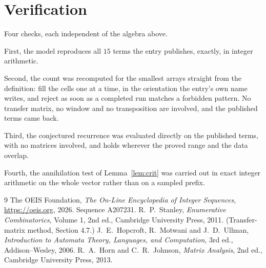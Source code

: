 \documentclass[11pt,a4paper]{article}
\theoremstyle{plain}
\theoremstyle{definition}
\begin{document}
\section{Verification}

Four checks, each independent of the algebra above.

First, the model reproduces all $15$ terms the entry publishes, exactly, in integer
arithmetic.

Second, the count was recomputed for the smallest arrays straight from the definition: fill the
cells one at a time, in the orientation the entry's own name writes, and reject as soon as a
completed run matches a forbidden pattern. No transfer matrix, no window and no transposition
are involved, and the published terms came back.

Third, the conjectured recurrence was evaluated directly on the published terms, with no
matrices involved, and holds wherever the proved range and the data overlap.

Fourth, the annihilation test of Lemma~\ref{lem:crit} was carried out in exact integer
arithmetic on the whole vector rather than on a sampled prefix.

\begin{thebibliography}{9}
 The OEIS Foundation, \emph{The On-Line Encyclopedia of Integer
Sequences}, \url{https://oeis.org}, 2026. Sequence A207231.
 R.~P.~Stanley, \emph{Enumerative Combinatorics}, Volume 1, 2nd ed.,
Cambridge University Press, 2011. (Transfer-matrix method, Section 4.7.)
 J.~E.~Hopcroft, R.~Motwani and J.~D.~Ullman, \emph{Introduction to Automata
Theory, Languages, and Computation}, 3rd ed., Addison--Wesley, 2006.
 R.~A.~Horn and C.~R.~Johnson, \emph{Matrix Analysis}, 2nd ed., Cambridge
University Press, 2013.
\end{thebibliography}
\end{document}
